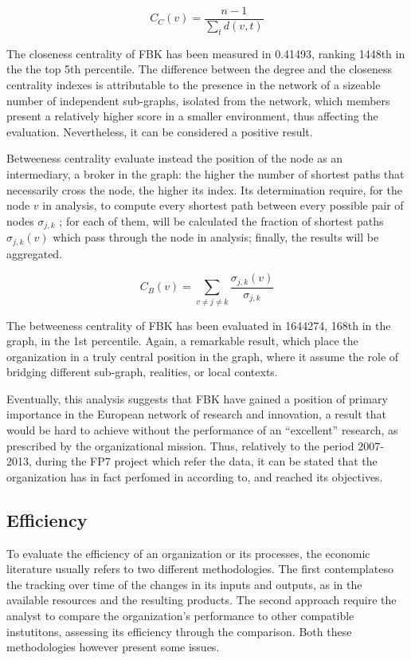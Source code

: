 \[
	C_C (v) =
		\frac 
			{n-1}
			{
				\sum_t d(v, t)
			} 
\]

The closeness centrality of FBK has been measured in 0.41493, ranking 1448th in the the top 5th percentile. The difference between the degree and the closeness centrality indexes is attributable to the presence in the network of a sizeable number of independent sub-graphs, isolated from the network, which members present a relatively higher score in a smaller environment, thus affecting the evaluation. Nevertheless, it can be considered a positive result.  

Betweeness centrality evaluate instead the position of the node as an intermediary, a broker in the graph: the higher the number of shortest paths that necessarily cross the node, the higher its index. Its determination require, for the node $v$ in analysis, to compute every shortest path between every possible pair of nodes $\sigma_{j,k}$ ; for each of them, will be calculated the fraction of shortest paths $\sigma_{j,k} (v)$ which pass through the node in analysis; finally, the results will be aggregated. 

\[
	C_B (v) =
		\sum_{v \neq j \neq k}
			\frac {\sigma_{j,k} (v)}{\sigma_{j,k}}
\]

The betweeness centrality of FBK has been evaluated in 1644274, 168th in the graph, in the 1st percentile. Again, a remarkable result, which place the organization in a truly central position in the graph, where it assume the role of bridging different sub-graph, realities, or local contexts. 

Eventually, this analysis suggests that FBK have gained a position of primary importance in the European network of research and innovation, a result that would be hard to achieve without the performance of an \enquote{excellent} research, as prescribed by the organizational mission. Thus, relatively to the period 2007-2013, during the FP7 project which refer the data, it can be stated that the organization has in fact perfomed in according to, and reached its objectives. 

\subsection{Efficiency}

To evaluate the efficiency of an organization or its processes, the economic literature usually refers to two different methodologies. The first contemplateso the tracking over time of the changes in its inputs and outputs, as in the available resources and the resulting products. The second approach require the analyst to compare the organization's performance to other compatible instutitons, assessing its efficiency through the comparison. Both these methodologies however present some issues.

